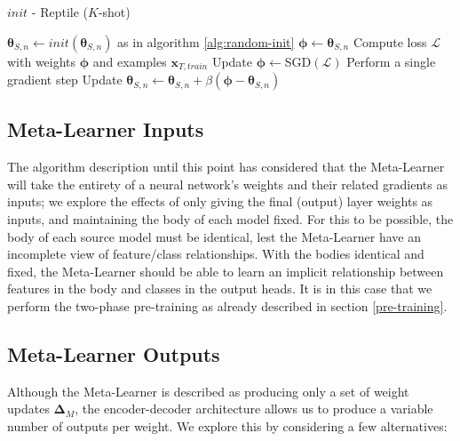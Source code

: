 \documentclass{report}
\begin{document}
\begin{algorithm}[h!]
	\caption{$init$ - Reptile ($K$-shot)}
	\label{reptile-init}
	\begin{algorithmic}[1]
			\State $\bm{\theta}_{S,n} \gets init(\bm{\theta}_{S,n})$ as in algorithm \ref{alg:random-init}
		\EndIf
		\State $\bm{\phi} \gets \bm{\theta}_{S,n}$
			\State Compute loss $\mathcal{L}$ with weights $\bm{\phi}$ and examples $\bm{x}_{T,train}$
			\State Update $\bm{\phi} \gets $SGD$(\mathcal{L})$
			\Comment Perform a single gradient step
		\EndFor
		\State Update $\bm{\theta}_{S,n} \gets \bm{\theta}_{S,n} + \beta(\bm{\phi} - \bm{\theta}_{S,n})$
		
	\end{algorithmic}
\end{algorithm}

\subsection{Meta-Learner Inputs} \label{ml-inputs}
The algorithm description until this point has considered that the Meta-Learner will take the entirety of a neural network's weights and their related gradients as inputs; we explore the effects of only giving the final (output) layer weights as inputs, and maintaining the body of each model fixed. For this to be possible, the body of each source model must be identical, lest the Meta-Learner have an incomplete view of feature/class relationships. With the bodies identical and fixed, the Meta-Learner should be able to learn an implicit relationship between features in the body and classes in the output heads. It is in this case that we perform the two-phase pre-training as already described in section \ref{pre-training}.

\subsection{Meta-Learner Outputs}
Although the Meta-Learner is described as producing only a set of weight updates $\bm{\Delta}_M$, the encoder-decoder architecture allows us to produce a variable number of outputs per weight. We explore this by considering a few alternatives:
\end{document}
